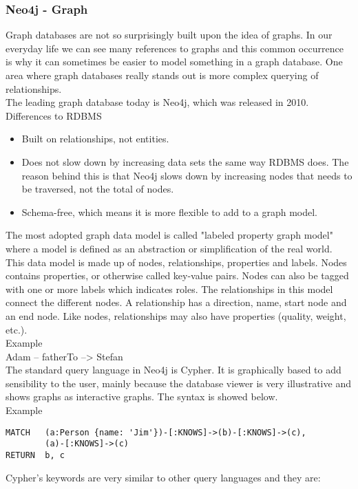 \subsubsection{Neo4j - Graph} %
Graph databases are not so surprisingly built upon the idea of graphs. In our everyday life we can see many references to graphs and this common occurrence is why it can sometimes be easier to model something in a graph database. One area where graph databases really stands out is more complex querying of relationships. 
\\[0.5cm]
The leading graph database today is Neo4j, which was released in 2010. 
\\[0.5cm]
Differences to RDBMS
\begin{itemize}
  \item Built on relationships, not entities.
  \item Does not slow down by increasing data sets the same way RDBMS does. The reason behind this is that Neo4j slows down by increasing nodes that needs to be traversed, not the total of nodes. 
  \item Schema-free, which means it is more flexible to add to a graph model.
\end{itemize}
The most adopted graph data model is called "labeled property graph model" where a model is defined as an abstraction or simplification of the real world. This data model is made up of nodes, relationships, properties and labels. Nodes contains properties, or otherwise called key-value pairs. Nodes can also be tagged with one or more labels which indicates roles. The relationships in this model connect the different nodes. A relationship has a direction, name, start node and an end node. Like nodes, relationships may also have properties (quality, weight, etc.).
\\
Example\\
    Adam -- fatherTo --> Stefan
\\[0.5cm]
The standard query language in Neo4j is Cypher. It is graphically based to add sensibility to the user, mainly because the database viewer is very illustrative and shows graphs as interactive graphs. The syntax is showed below.\\
Example
\begin{lstlisting}
MATCH   (a:Person {name: 'Jim'})-[:KNOWS]->(b)-[:KNOWS]->(c),
        (a)-[:KNOWS]->(c)
RETURN  b, c
\end{lstlisting}
Cypher's keywords are very similar to other query languages and they are:

